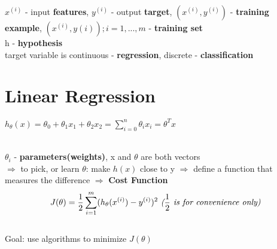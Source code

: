 \documentclass{article}
\begin{document}
\noindent\begin{math}x^{(i)}\end{math} - input \textbf{features}, \begin{math}y^{(i)}\end{math} - output \textbf{target}, \begin{math}(x^{(i)}, y^{(i)})\end{math} - \textbf{training example}, \begin{math}{(x^{(i)}, y{(i)}); i = 1,...,m}\end{math} - \textbf{training set}\\
h - \textbf{hypothesis}\\
target variable is continuous - \textbf{regression}, discrete - \textbf{classification}

\section{Linear Regression}
\centerline{\begin{math}h_\theta(x) = \theta_0 + \theta_1x_1 + \theta_2x_2 = \sum^n_{i=0}\theta_ix_i = \theta^Tx\end{math}}\\
$\theta_i$ - \textbf{parameters(weights)}, x and $\theta$ are both vectors\\
$\Rightarrow$ to pick, or learn \begin{math}\theta\end{math}: make \begin{math}h(x)\end{math} close to y $\Rightarrow$ define a function that measures the difference $\Rightarrow$ \textbf{Cost Function}\\
$$J(\theta) = \frac{1}{2}\sum^m_{i=1}(h_\theta(x^{(i)}) - y^{(i)})^2 \text{   \textit{($\frac{1}{2}$ is for convenience only)}}$$\\
Goal: use algorithms to minimize $J(\theta)$
\end{document}
